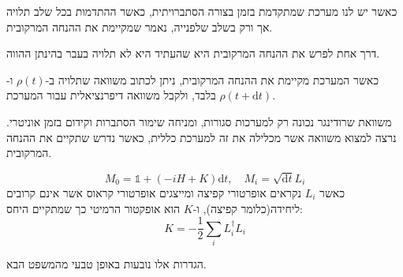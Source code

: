 \documentclass{tstextbook}
\begin{document}
\begin{definition}
כאשר יש לנו מערכת שמתקדמת בזמן בצורה הסתברויתית, כאשר ההתדמות בכל שלב תלויה אך ורק בשלב שלפנייה, נאמר שמקיימת את ההנחה המרקובית.

\end{definition}
\begin{remark}
דרך אחת לפרש את ההנחה המרקובית היא שהעתיד היא לא תלויה בעבר בהינתן ההווה.

\end{remark}
\begin{remark}
כאשר המערכת מקיימת את ההנחה המרקובית, ניתן לכתוב משוואה שתלויה ב-\(\rho(t)\) ו-\(\rho\left( t+\mathrm{d}t \right)\) בלבד, ולקבל משוואה דיפרנציאלית עבור המערכת.

\end{remark}
משוואת שרודינגר נכונה רק למערכות סגורות, ומניחה שימור הסתברות וקידום בזמן אוניטרי. נרצה למצוא משוואה אשר מכלילה את זה למערכת כללית, כאשר נדרש שתקיים את ההנחה המרקובית.

\begin{definition}
$$M_{0}=\mathbb{1} +(-i H+K)\mathrm{d} t,\quad M_{i}=\sqrt{\mathrm{d} t}L_{i}$$
כאשר \(L_{i}\) נקראים אופרטורי קפיצה ומייצגים אופרטורי קראוס אשר אינם קרובים ליחידה(כלומר קפיצה), ו-\(K\) הוא אופקטור הרמיטי כך שמתקיים היחס:
$$K=-\frac{1}{2}\sum_{i}L_{i}^{\dagger}L_{i}$$

\end{definition}
הגדרות אלו נובעות באופן טבעי מהמשפט הבא.
\end{document}

